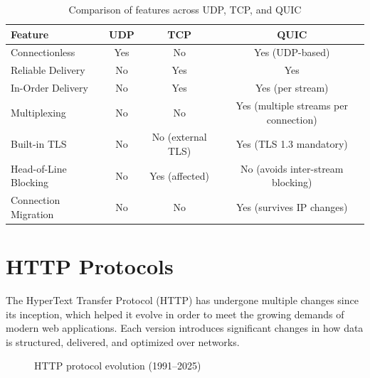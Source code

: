 \begin{table}[H]
\centering
\begin{tabular}{|p{4cm}|c|c|c|}
\hline
\textbf{Feature} & \textbf{UDP} & \textbf{TCP} & \textbf{QUIC} \\
\hline
Connectionless & Yes & No & Yes (UDP-based) \\
\hline
Reliable Delivery & No & Yes & Yes \\
\hline
In-Order Delivery & No & Yes & Yes (per stream) \\
\hline
Multiplexing & No & No & Yes (multiple streams per connection) \\
\hline
Built-in TLS & No & No (external TLS) & Yes (TLS 1.3 mandatory) \\
\hline
Head-of-Line Blocking & No & Yes (affected) & No (avoids inter-stream blocking) \\
\hline
Connection Migration & No & No & Yes (survives IP changes) \\
\hline
\end{tabular}
\caption{Comparison of features across UDP, TCP, and QUIC}
\label{tab:tcp-udp-quic-comparison}
\end{table}



\section{HTTP Protocols}

The HyperText Transfer Protocol (HTTP) has undergone multiple changes since its inception, which helped it evolve in order to meet the growing demands of modern web applications. Each version introduces significant changes in how data is structured, delivered, and optimized over networks.
\begin{figure}
\centering
{}
\caption{HTTP protocol evolution (1991--2025)}
\label{fig:http-timeline}
\end{figure}


